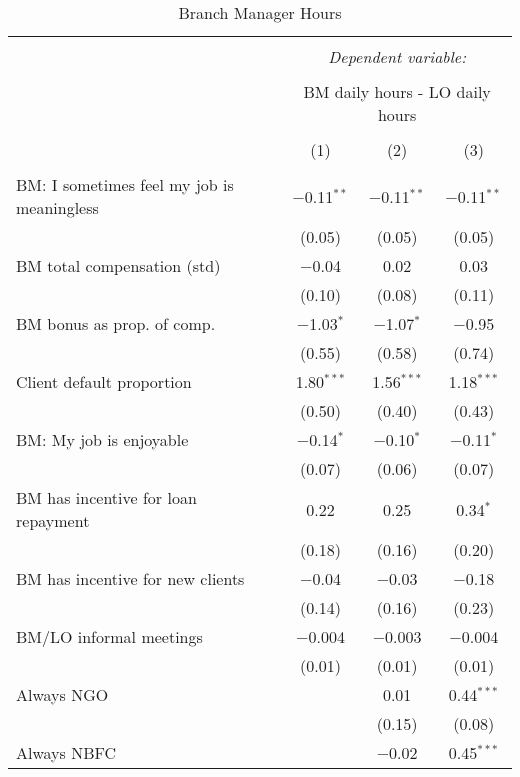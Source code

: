 \documentclass[11pt]{article}
\begin{document}
\begin{table}[!htbp] \centering 
  \caption{Branch Manager Hours} 
  \label{} 
\footnotesize 
\begin{tabular}{@{\extracolsep{5pt}}lccc} 
\\[-1.8ex]\hline 
\hline \\[-1.8ex] 
 & \multicolumn{3}{c}{\textit{Dependent variable:}} \\ 
\cline{2-4} 
\\[-1.8ex] & \multicolumn{3}{c}{BM daily hours - LO daily hours} \\ 
\\[-1.8ex] & (1) & (2) & (3)\\ 
\hline \\[-1.8ex] 
 BM: I sometimes feel my job is meaningless & $-$0.11$^{**}$ & $-$0.11$^{**}$ & $-$0.11$^{**}$ \\ 
  & (0.05) & (0.05) & (0.05) \\ 
  BM total compensation (std) & $-$0.04 & 0.02 & 0.03 \\ 
  & (0.10) & (0.08) & (0.11) \\ 
  BM bonus as prop. of comp. & $-$1.03$^{*}$ & $-$1.07$^{*}$ & $-$0.95 \\ 
  & (0.55) & (0.58) & (0.74) \\ 
  Client default proportion & 1.80$^{***}$ & 1.56$^{***}$ & 1.18$^{***}$ \\ 
  & (0.50) & (0.40) & (0.43) \\ 
  BM: My job is enjoyable & $-$0.14$^{*}$ & $-$0.10$^{*}$ & $-$0.11$^{*}$ \\ 
  & (0.07) & (0.06) & (0.07) \\ 
  BM has incentive for loan repayment & 0.22 & 0.25 & 0.34$^{*}$ \\ 
  & (0.18) & (0.16) & (0.20) \\ 
  BM has incentive for new clients & $-$0.04 & $-$0.03 & $-$0.18 \\ 
  & (0.14) & (0.16) & (0.23) \\ 
  BM/LO informal meetings & $-$0.004 & $-$0.003 & $-$0.004 \\ 
  & (0.01) & (0.01) & (0.01) \\ 
  Always NGO &  & 0.01 & 0.44$^{***}$ \\ 
  &  & (0.15) & (0.08) \\ 
  Always NBFC &  & $-$0.02 & 0.45$^{***}$ \\ 

\end{tabular}
\end{table}
\end{document}
